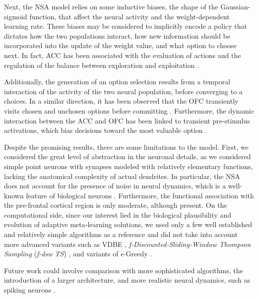 Next, the NSA model relies on some inductive biases, the shape of the Gaussian-sigmoid function, that affect the neural activity and the weight-dependent learning rate.
These biases may be considered to implicitly encode a policy that dictates how the two populations interact, how new information should be incorporated into the update of the weight value, and what option to choose next.
In fact, ACC has been associated with the evaluation of actions and the regulation of the balance between exploration and exploitation \cite{khamassiChapter22Medial2013, kollingValueSearchPersistence2016}.

Additionally, the generation of an option selection results from a temporal interaction of the activity of the two neural population, before converging to a choices.
In a similar direction, it has been observed that the OFC transiently visits chosen and unchosen options before committing \cite{richDecodingSubjectiveDecisions2016}.
Furthermore, the dynamic interaction between the ACC and OFC has been linked to transient pre-stimulus activations, which bias decisions toward the most valuable option \cite{funahashiPrefrontalContributionDecisionMaking2017, marcosDeterminingMonkeyFree2016, balewskiValueDynamicsAffect2023}.

Despite the promising results, there are some limitations to the model. First, we considered the great level of abstraction in the neuronal details, as we considered simple point neurons with synapses modeled with relatively elementary functions, lacking the anatomical complexity of actual dendrites.
In particular, the NSA does not account for the presence of noise in neural dynamics, which is a well-known feature of biological neurons \cite{faisalNoiseNeuronsOther2012}.
Furthermore, the functional association with the pre-frontal cortical region is only moderate, although present.
On the computational side, since our interest lied in the biological plausibility and evolution of adaptive meta-learning solutions, we used only a few well established and relatively simple algorithms as a reference and did not take into account more advanced variants such as VDBE \cite{tokicAdaptiveEGreedyExploration2010, tokicValueDifferenceBasedExploration2011}, \textit{f-Discounted-Sliding-Window Thompson Sampling} (\textit{f-dsw TS}) \cite{cavenaghiNonStationaryMultiArmed2021}, and variants of $\epsilon$-Greedy \cite{qiForcedExplorationBandit2023}.

Future work could involve comparison with more sophisticated algorithms, the introduction of a larger architecture, and more realistic neural dynamics, such as spiking neurons \cite{nunesSpikingNeuralNetworks2022}.

